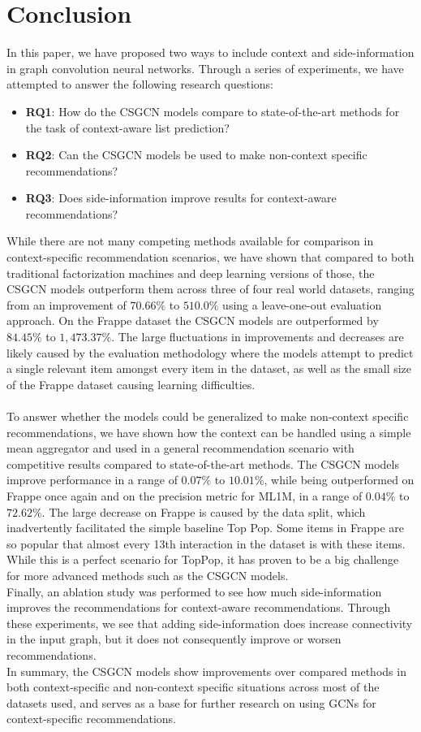 \section{Conclusion}\label{sec:conclusion}
In this paper, we have proposed two ways to include context and side-information in graph convolution neural networks.
Through a series of experiments, we have attempted to answer the following research questions:
\begin{itemize}
    \item \textbf{RQ1}: How do the CSGCN models compare to state-of-the-art methods for the task of context-aware list prediction?
    \item \textbf{RQ2}: Can the CSGCN models be used to make non-context specific recommendations?
    \item \textbf{RQ3}: Does side-information improve results for context-aware recommendations?
\end{itemize}
While there are not many competing methods available for comparison in context-specific recommendation scenarios, we have shown that compared to both traditional factorization machines and deep learning versions of those, the CSGCN models outperform them across three of four real world datasets, ranging from an improvement of $70.66\%$ to $510.0\%$ using a leave-one-out evaluation approach.
On the Frappe dataset the CSGCN models are outperformed by $84.45\%$ to $1,473.37\%$.
The large fluctuations in improvements and decreases are likely caused by the evaluation methodology where the models attempt to predict a single relevant item amongst every item in the dataset, as well as the small size of the Frappe dataset causing learning difficulties.\\\\
To answer whether the models could be generalized to make non-context specific recommendations, we have shown how the context can be handled using a simple mean aggregator and used in a general recommendation scenario with competitive results compared to state-of-the-art methods.
The CSGCN models improve performance in a range of $0.07\%$ to $10.01\%$, while being outperformed on Frappe once again and on the precision metric for ML1M, in a range of $0.04\%$ to $72.62\%$.
The large decrease on Frappe is caused by the data split, which inadvertently facilitated the simple baseline Top Pop.
Some items in Frappe are so popular that almost every 13th interaction in the dataset is with these items.
While this is a perfect scenario for TopPop, it has proven to be a big challenge for more advanced methods such as the CSGCN models.
\\
Finally, an ablation study was performed to see how much side-information improves the recommendations for context-aware recommendations.
Through these experiments, we see that adding side-information does increase connectivity in the input graph, but it does not consequently improve or worsen recommendations.
\\
In summary, the CSGCN models show improvements over compared methods in both context-specific and non-context specific situations across most of the datasets used, and serves as a base for further research on using GCNs for context-specific recommendations.

